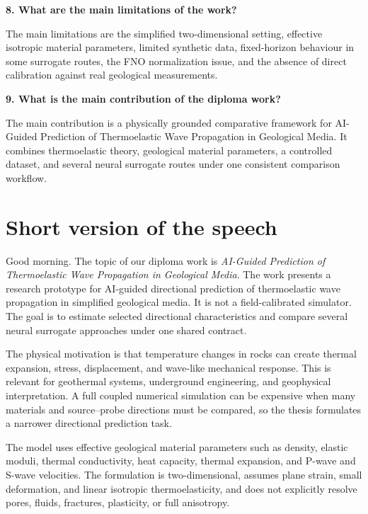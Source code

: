 \documentclass[11pt,a4paper]{article}
\begin{document}
\textbf{8. What are the main limitations of the work?}

The main limitations are the simplified two-dimensional setting, effective isotropic material parameters, limited synthetic data, fixed-horizon behaviour in some surrogate routes, the FNO normalization issue, and the absence of direct calibration against real geological measurements.

\textbf{9. What is the main contribution of the diploma work?}

The main contribution is a physically grounded comparative framework for AI-Guided Prediction of Thermoelastic Wave Propagation in Geological Media. It combines thermoelastic theory, geological material parameters, a controlled dataset, and several neural surrogate routes under one consistent comparison workflow.

\newpage
\section*{\color{AcademicNavy}Short version of the speech}

Good morning. The topic of our diploma work is \textit{AI-Guided Prediction of Thermoelastic Wave Propagation in Geological Media}. The work presents a research prototype for AI-guided directional prediction of thermoelastic wave propagation in simplified geological media. It is not a field-calibrated simulator. The goal is to estimate selected directional characteristics and compare several neural surrogate approaches under one shared contract.

The physical motivation is that temperature changes in rocks can create thermal expansion, stress, displacement, and wave-like mechanical response. This is relevant for geothermal systems, underground engineering, and geophysical interpretation. A full coupled numerical simulation can be expensive when many materials and source--probe directions must be compared, so the thesis formulates a narrower directional prediction task.

The model uses effective geological material parameters such as density, elastic moduli, thermal conductivity, heat capacity, thermal expansion, and P-wave and S-wave velocities. The formulation is two-dimensional, assumes plane strain, small deformation, and linear isotropic thermoelasticity, and does not explicitly resolve pores, fluids, fractures, plasticity, or full anisotropy.
\end{document}
